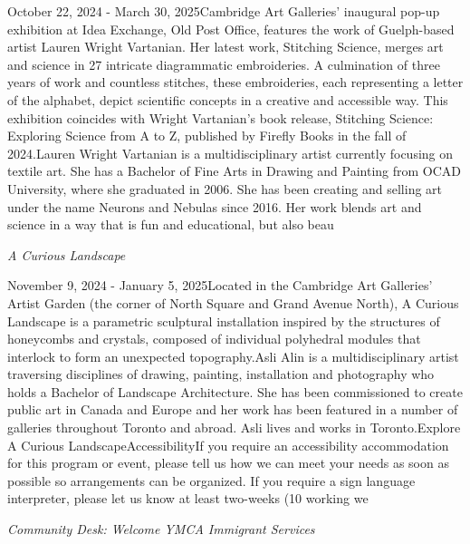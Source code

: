 \documentclass[letterpaper, 10pt]{article}
\newcommand{\subtitle}[1]{\textit{\large #1}\vspace{0.5em}}
\newcommand{\articlecontent}[1]{\small #1\vspace{1em}}
\begin{document}
\begin{multicols}{2}
{October 22, 2024 - March 30, 2025Cambridge Art Galleries' inaugural pop-up exhibition at Idea Exchange, Old Post Office, features the work of Guelph-based artist Lauren Wright Vartanian. Her latest work, Stitching Science, merges art and science in 27 intricate diagrammatic embroideries. A culmination of three years of work and countless stitches, these embroideries, each representing a letter of the alphabet, depict scientific concepts in a creative and accessible way. This exhibition coincides with Wright Vartanian’s book release, Stitching Science: Exploring Science from A to Z, published by Firefly Books in the fall of 2024.Lauren Wright Vartanian is a multidisciplinary artist currently focusing on textile art. She has a Bachelor of Fine Arts in Drawing and Painting from OCAD University, where she graduated in 2006. She has been creating and selling art under the name Neurons and Nebulas since 2016. Her work blends art and science in a way that is fun and educational, but also beau
}
\vspace{10px}

\subtitle{A Curious Landscape}

\articlecontent{

\qrcode[height=1.5cm]{https://ideaexchange.libnet.info/event/12212309}
\vspace{10px}

November 9, 2024 - January 5, 2025Located in the Cambridge Art Galleries' Artist Garden (the corner of North Square and Grand Avenue North), A Curious Landscape is a parametric sculptural installation inspired by the structures of honeycombs and crystals, composed of individual polyhedral modules that interlock to form an unexpected topography.Asli Alin is a multidisciplinary artist traversing disciplines of drawing, painting, installation and photography who holds a Bachelor of Landscape Architecture. She has been commissioned to create public art in Canada and Europe and her work has been featured in a number of galleries throughout Toronto and abroad. Asli lives and works in Toronto.Explore A Curious LandscapeAccessibilityIf you require an accessibility accommodation for this program or event, please tell us how we can meet your needs as soon as possible so arrangements can be organized. If you require a sign language interpreter, please let us know at least two-weeks (10 working we
}
\vspace{10px}

\subtitle{Community Desk: Welcome YMCA Immigrant Services}

\articlecontent{

}
\end{multicols}
\end{document}
